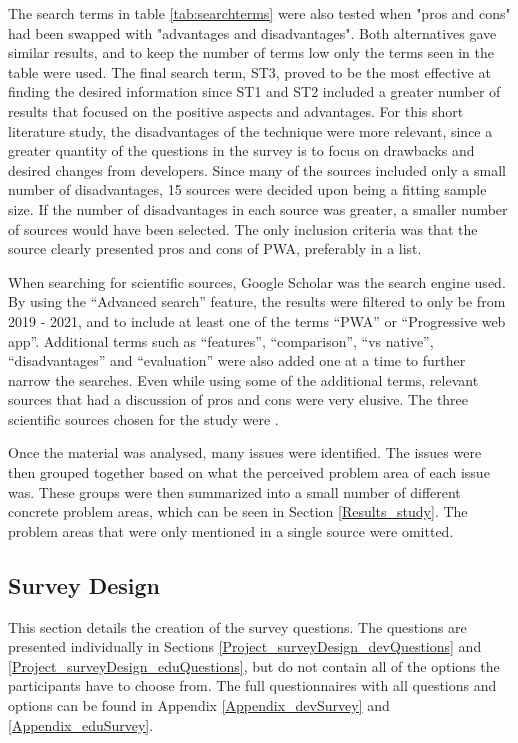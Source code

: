 \documentclass[a4paper,12pt]{article}
\begin{document}
The search terms in table \ref{tab:searchterms} were also tested when "pros and cons" had been swapped with "advantages and disadvantages". Both alternatives gave similar results, and to keep the number of terms low only the terms seen in the table were used. The final search term, ST3, proved to be the most effective at finding the desired information since ST1 and ST2 included a greater number of results that focused on the positive aspects and advantages. For this short literature study, the disadvantages of the technique were more relevant, since a greater quantity of the questions in the survey is to focus on drawbacks and desired changes from developers. Since many of the sources included only a small number of disadvantages, 15 sources were decided upon being a fitting sample size. If the number of disadvantages in each source was greater, a smaller number of sources would have been selected. The only inclusion criteria was that the source clearly presented pros and cons of PWA, preferably in a list.

When searching for scientific sources, Google Scholar was the search engine used. By using the “Advanced search” feature, the results were filtered to only be from 2019 - 2021, and to include at least one of the terms “PWA” or “Progressive web app”. Additional terms such as “features”, “comparison”, “vs native”, “disadvantages” and “evaluation” were also added one at a time to further narrow the searches. Even while using some of the additional terms, relevant sources that had a discussion of pros and cons were very elusive. The three scientific sources chosen for the study were \cite{dawning_of_pwa, pwa_in_modern_webdeb, pwa_unified}.

Once the material was analysed, many issues were identified. The issues were then grouped together based on what the perceived problem area of each issue was. These groups were then summarized into a small number of different concrete problem areas, which can be seen in Section \ref{Results_study}. The problem areas that were only mentioned in a single source were omitted.

\subsection{Survey Design}
\label{Project_surveyDesign}
This section details the creation of the survey questions. The questions are presented individually in Sections \ref{Project_surveyDesign_devQuestions} and \ref{Project_surveyDesign_eduQuestions}, but do not contain all of the options the participants have to choose from. The full questionnaires with all questions and options can be found in Appendix \ref{Appendix_devSurvey} and \ref{Appendix_eduSurvey}.
\end{document}
